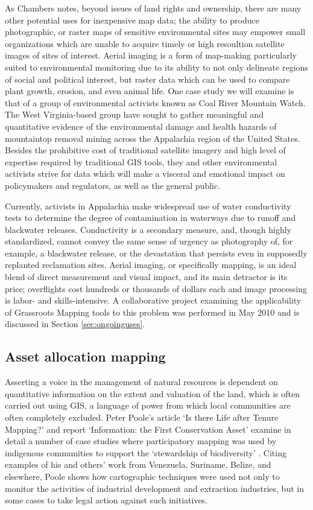 \documentclass[11pt,oneside,notitlepage]{report}
\begin{document}
As Chambers notes, beyond issues of land rights and ownership, there are many other potential uses for inexpensive map data; the ability to produce photographic, or raster maps of sensitive environmental sites may empower small organizations which are unable to acquire timely or high resoultion satellite images of sites of interest. Aerial imaging is a form of map-making particularly suited to environmental monitoring due to its ability to not only delineate regions of social and political interest, but raster data which can be used to compare plant growth, erosion, and even animal life. One case study we will examine is that of a group of environmental activists known as Coal River Mountain Watch. The West Virginia-based group have sought to gather meaningful and quantitative evidence of the environmental damage and health hazards of mountaintop removal mining across the Appalachia region of the United States. Besides the prohibitive cost of traditional satellite imagery and high level of expertise required by traditional GIS tools, they and other environmental activists strive for data which will make a visceral and emotional impact on policymakers and regulators, as well as the general public. 

Currently, activists in Appalachia make widespread use of water conductivity tests to determine the degree of contamination in waterways due to runoff and blackwater releases. Conductivity is a secondary measure, and, though highly standardized, cannot convey the same sense of urgency as photography of, for example, a blackwater release, or the devastation that persists even in supposedly replanted reclamation sites. Aerial imaging, or specifically mapping, is an ideal blend of direct measurement and visual impact, and its main detractor is its price; overflights cost hundreds or thousands of dollars each and image processing is labor- and skills-intensive. A collaborative project examining the applicability of Grassroots Mapping tools to this problem was performed in May 2010 and is discussed in Section \ref{sec:ongoinguses}.

\subsection{Asset allocation mapping}

Asserting a voice in the management of natural resources is dependent on quantitative information on the extent and valuation of the land, which is often carried out using GIS, a language of power from which local communities are often completely excluded. Peter Poole's article `Is there Life after Tenure Mapping?' and report `Information: the First Conservation Asset' examine in detail a number of case studies where participatory mapping was used by indigenous communities to support the `stewardship of biodiversity' \cite{poole2007belize}. Citing examples of his and others' work from Venezuela, Suriname, Belize, and elsewhere, Poole shows how cartographic techniques were used not only to monitor the activities of industrial development and extraction industries, but in some cases to take legal action against such initiatives.  
\end{document}
